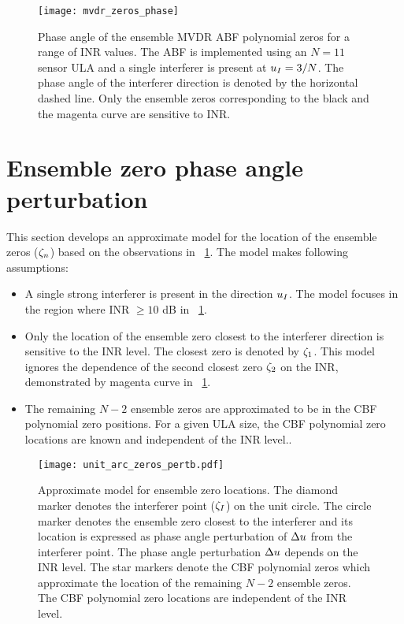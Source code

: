 
\begin{figure}[!hp]
  \centering
  \texttt{[image: mvdr\_zeros\_phase]}
  \caption[Phase angle of the ensemble MVDR ABF polynomial
  zeros.]{Phase angle of the ensemble MVDR ABF polynomial zeros for a
    range of INR values. The ABF is implemented using an $N = 11$
    sensor ULA and a single interferer is present at $u_I = 3/N$.
    The phase angle of the interferer direction is denoted by the
    horizontal dashed line. Only the ensemble zeros corresponding to
    the black and the magenta curve are sensitive to INR.}
  \label{fig:mvdr-zeros-phase}
\end{figure}

\section{Ensemble zero phase angle perturbation}
\label{sec:perturbation-model}
This section develops an approximate model for the location of the
ensemble zeros ($\zeta_n$) based on the observations in
\figurename{}~\ref{fig:mvdr-zeros-phase}. The model makes following
assumptions:
\begin{itemize}
\item A single strong interferer is present in the direction
  $u_I$. The model focuses in the region where INR $\geq 10$ dB in \figurename{}~\ref{fig:mvdr-zeros-phase}.
\item Only the location of the ensemble zero closest to the interferer
  direction is sensitive to the INR level. The closest zero is denoted
  by $\zeta_1$. This model ignores the dependence of the second
  closest zero $\zeta_2$ on the INR, demonstrated by magenta curve in
  \figurename{}~\ref{fig:mvdr-zeros-phase}.
\item The remaining $N - 2$ ensemble zeros are approximated to be in
  the CBF polynomial zero positions. For a given ULA size, the CBF
  polynomial zero locations are known and independent of the INR level.\cite{vtree2002oap}.
\end{itemize}

\begin{figure}[!hp]
  \centering
  \texttt{[image: unit\_arc\_zeros\_pertb.pdf]}
  \caption[Approximate model for ensemble zero locations.]{Approximate model for
    ensemble zero locations. The diamond marker denotes the interferer
    point ($\zeta_I$) on the unit circle. The circle marker denotes
    the ensemble zero closest to the interferer and its location is
    expressed as phase angle perturbation of $\Delta u$ from the
    interferer point. The phase angle perturbation $\Delta u$ depends
    on the INR level. The star markers denote the CBF polynomial zeros
    which approximate the location of the remaining $N - 2$ ensemble
    zeros. The CBF polynomial zero locations are independent of the
    INR level.}
  \label{fig:perturb-model}
\end{figure}

